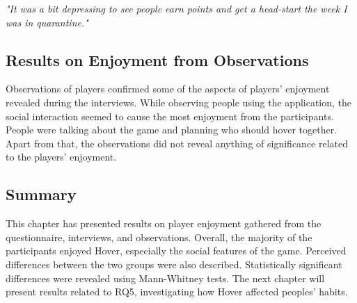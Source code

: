 \textit{"It was a bit depressing to see people earn points and get a head-start the week I was in quarantine." \footnotemark[\value{footnote}]}


\subsection{Results on Enjoyment from Observations}
Observations of players confirmed some of the aspects of players’ enjoyment revealed during the interviews. While observing people using the application, the social interaction seemed to cause the most enjoyment from the participants. People were talking about the game and planning who should hover together. Apart from that, the observations did not reveal anything of significance related to the players’ enjoyment.

\subsection{Summary}
This chapter has presented results on player enjoyment gathered from the questionnaire, interviews, and observations. Overall, the majority of the participants enjoyed Hover, especially the social features of the game. Perceived differences between the two groups were also described. Statistically significant differences were revealed using Mann-Whitney tests. The next chapter will present results related to RQ5, investigating how Hover affected peoples’ habits.
